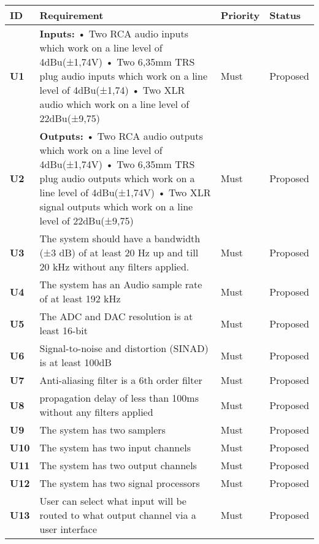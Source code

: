 \begin{longtable}{|l|p{10cm}|l|l|}
	\hline
	\textbf{ID} & \textbf{Requirement} & \textbf{Priority} & \textbf{Status}\\ \hline 
	\textbf{U1} & \textbf{Inputs:} \newline
	• Two RCA audio inputs which work on a line level of 4dBu(±1,74V)\newline
	• Two 6,35mm TRS plug audio inputs which work on a line level of 4dBu(±1,74)\newline
	• Two XLR audio which work on a line level of 22dBu(±9,75) 												& Must   & Proposed\\ \hline
	\textbf{U2} & \textbf{Outputs:} \newline
	• Two RCA audio outputs which work on a line level of 4dBu(±1,74V)\newline
	• Two 6,35mm TRS plug audio outputs which work on a line level of 4dBu(±1,74V)\newline
	• Two XLR signal outputs which work on a line level of 22dBu(±9,75)										& Must   & Proposed\\ \hline
	\textbf{U3} &The system should have a bandwidth (±3 dB) of at least 20 Hz up and till 20 kHz without any filters applied. 	& Must   & Proposed\\ \hline
	\textbf{U4} &The system has an Audio sample rate of at least 192 kHz 										& Must   & Proposed\\ \hline
	\textbf{U5} &The ADC and DAC resolution is at least 16-bit 												& Must   & Proposed\\ \hline
	\textbf{U6} &Signal-to-noise and distortion (SINAD) is at least 100dB  										& Must   & Proposed\\ \hline
	\textbf{U7} &Anti-aliasing filter is a 6th order filter										 		& Must   & Proposed\\ \hline
	\textbf{U8} &propagation delay of less than 100ms without any filters applied									& Must   & Proposed\\ \hline
	\textbf{U9} &The system has two samplers											 				& Must   & Proposed\\ \hline
	\textbf{U10}&The system has two input channels 														& Must   & Proposed\\ \hline
	\textbf{U11}&The system has two output channels														& Must   & Proposed\\ \hline
	\textbf{U12}&The system has two signal processors													& Must   & Proposed\\ \hline
	\textbf{U13}&User can select what input will be routed to what output channel via a user interface					& Must   & Proposed\\ \hline

\end{longtable}
